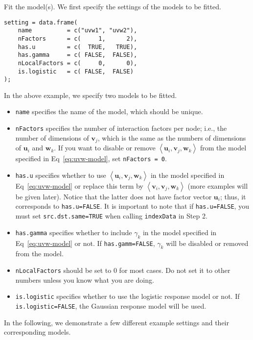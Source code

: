 \documentclass[10pt]{article}
\begin{document}
Fit the model(s).  We first specify the settings of the models to be fitted.
{\small\begin{verbatim}
setting = data.frame(
    name          = c("uvw1", "uvw2"),
    nFactors      = c(     1,      2),
    has.u         = c(  TRUE,   TRUE),
    has.gamma     = c( FALSE,  FALSE),
    nLocalFactors = c(     0,      0),
    is.logistic   = c( FALSE,  FALSE)
);
\end{verbatim}}
\noindent In the above example, we specify two models to be fitted.
\begin{itemize}
\item {\tt name} specifies the name of the model, which should be unique.
\item {\tt nFactors} specifies the number of interaction factors per node; i.e., the number of dimensions of $\bm{v}_j$, which is the same as the numbers of dimensions of $\bm{u}_i$ and $\bm{w}_k$.  If you want to disable or remove $\left<\bm{u}_i, \bm{v}_j, \bm{w}_k\right>$ from the model specified in Eq~\ref{eq:uvw-model}, set {\tt nFactors = 0}.
\item {\tt has.u} specifies whether to use $\left<\bm{u}_i, \bm{v}_j, \bm{w}_k\right>$ in the model specified in Eq~\ref{eq:uvw-model} or replace this term by $\left<\bm{v}_i, \bm{v}_j, \bm{w}_k\right>$ (more examples will be given later).  Notice that the latter does not have factor vector $\bm{u}_i$; thus, it corresponds to {\tt has.u=FALSE}.  It is important to note that if {\tt has.u=FALSE}, you must set {\tt src.dst.same=TRUE} when calling {\tt indexData} in Step 2.
\item {\tt has.gamma} specifies whether to include $\gamma_k$ in the model specified in Eq~\ref{eq:uvw-model} or not.  If {\tt has.gamm=FALSE}, $\gamma_k$ will be disabled or removed from the model.
\item {\tt nLocalFactors} should be set to 0 for most cases.  Do not set it to other numbers unless you know what you are doing.
\item {\tt is.logistic} specifies whether to use the logistic response model or not. If {\tt is.logistic=FALSE}, the Gaussian response model will be used.
\end{itemize}
In the following, we demonstrate a few different example settings and their corresponding models.
\end{document}
